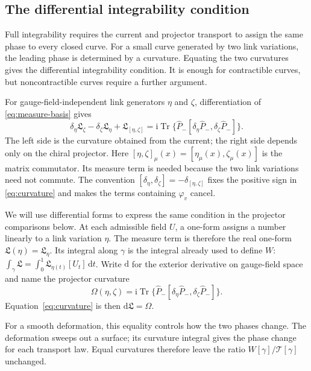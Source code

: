 \documentclass[11pt,a4paper]{article}
\theoremstyle{remark}
\DeclareMathOperator{\Tr}{Tr}
\newcommand{\dd}{\mathrm d}
\newcommand{\ii}{\mathrm i}
\begin{document}
\subsection{The differential integrability condition}

Full integrability requires the current and projector
transport to assign the same phase to every closed curve.
For a small curve generated by two link variations, the
leading phase is determined by a curvature. Equating the
two curvatures gives the differential integrability
condition. It is enough for contractible curves, but
noncontractible curves require a further argument.

For gauge-field-independent link generators \(\eta\) and
\(\zeta\), differentiation of \eqref{eq:measure-basis} gives
\begin{equation}
 \delta_\eta\mathfrak L_\zeta
 -\delta_\zeta\mathfrak L_\eta
 +\mathfrak L_{[\eta,\zeta]}
 =\ii\Tr\{\widehat P_-
        [\delta_\eta\widehat P_-,\delta_\zeta\widehat P_-]\}.
 \label{eq:curvature}
\end{equation}
The left side is the curvature obtained from the current;
the right side depends only on the chiral projector.
Here \([\eta,\zeta]_\mu(x)=[\eta_\mu(x),\zeta_\mu(x)]\)
is the matrix commutator. Its measure term is needed because
the two link variations need not commute. The convention
\([\delta_\eta,\delta_\zeta]=-\delta_{[\eta,\zeta]}\)
fixes the positive sign in \eqref{eq:curvature} and makes
the terms containing \(\varphi_v\) cancel.

We will use differential forms to express the same
condition in the projector comparisons below. At each admissible
field \(U\), a one-form assigns a number linearly to a link
variation \(\eta\). The measure term is therefore the real one-form
\(\mathfrak L(\eta)=\mathfrak L_\eta\).
Its integral along \(\gamma\) is the integral already used
to define \(W\):
\(\int_\gamma\mathfrak L=\int_0^1
\mathfrak L_{\eta(t)}[U_t]\,\dd t\).
Write \(\dd\) for the exterior derivative on gauge-field
space and name the projector curvature
\begin{equation}
 \Omega(\eta,\zeta)=\ii\Tr\{\widehat P_-
        [\delta_\eta\widehat P_-,\delta_\zeta\widehat P_-]\}.
 \label{eq:projector-curvature}
\end{equation}
Equation~\eqref{eq:curvature} is then
\(\dd\mathfrak L=\Omega\).

For a smooth deformation,
this equality controls how the two phases change. The deformation sweeps out
a surface; its curvature integral gives the phase change
for each transport law. Equal curvatures therefore leave
the ratio \(W[\gamma]/\mathcal T[\gamma]\) unchanged.
\end{document}

